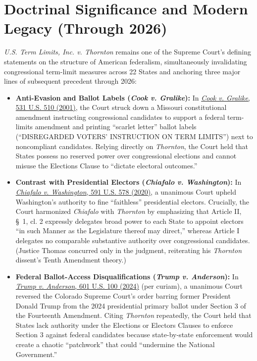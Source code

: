 \documentclass[12pt]{article}
\begin{document}
\section{Doctrinal Significance and Modern Legacy (Through 2026)}

\textit{U.S. Term Limits, Inc. v. Thornton} remains one of the Supreme Court's defining statements on the structure of American federalism, simultaneously invalidating congressional term-limit measures across 22 States and anchoring three major lines of subsequent precedent through 2026:

\begin{itemize}
    \item \textbf{Anti-Evasion and Ballot Labels (\textit{Cook v. Gralike}):} In \href{https://supreme.justia.com/cases/federal/us/531/510/}{\textit{Cook v. Gralike}, 531 U.S. 510 (2001)}, the Court struck down a Missouri constitutional amendment instructing congressional candidates to support a federal term-limits amendment and printing ``scarlet letter'' ballot labels (``DISREGARDED VOTERS' INSTRUCTION ON TERM LIMITS'') next to noncompliant candidates. Relying directly on \textit{Thornton}, the Court held that States possess no reserved power over congressional elections and cannot misuse the Elections Clause to ``dictate electoral outcomes.''
    \item \textbf{Contrast with Presidential Electors (\textit{Chiafalo v. Washington}):} In \href{https://supreme.justia.com/cases/federal/us/591/19-465/}{\textit{Chiafalo v. Washington}, 591 U.S. 578 (2020)}, a unanimous Court upheld Washington's authority to fine ``faithless'' presidential electors. Crucially, the Court harmonized \textit{Chiafalo} with \textit{Thornton} by emphasizing that Article II, \S~1, cl. 2 expressly delegates broad power to each State to appoint electors ``in such Manner as the Legislature thereof may direct,'' whereas Article I delegates no comparable substantive authority over congressional candidates. (Justice Thomas concurred only in the judgment, reiterating his \textit{Thornton} dissent's Tenth Amendment theory.)
    \item \textbf{Federal Ballot-Access Disqualifications (\textit{Trump v. Anderson}):} In \href{https://supreme.justia.com/cases/federal/us/601/23-719/}{\textit{Trump v. Anderson}, 601 U.S. 100 (2024)} (per curiam), a unanimous Court reversed the Colorado Supreme Court's order barring former President Donald Trump from the 2024 presidential primary ballot under Section 3 of the Fourteenth Amendment. Citing \textit{Thornton} repeatedly, the Court held that States lack authority under the Elections or Electors Clauses to enforce Section 3 against federal candidates because state-by-state enforcement would create a chaotic ``patchwork'' that could ``undermine the National Government.''
\end{itemize}
\end{document}

